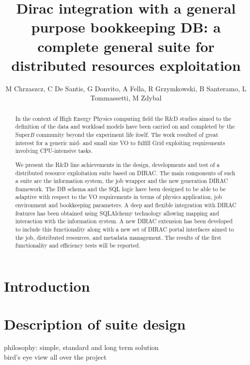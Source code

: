 \documentclass[a4paper]{jpconf}
\begin{document}
\title{Dirac integration with a general purpose bookkeeping DB: a complete general suite for distributed resources exploitation}

\author{M Chrzaszcz, C De Santis, G Donvito, A Fella, R Grzymkowski, B Santeramo, L Tommassetti, M Zdybal}

%
%
%
%
%

\begin{abstract}
In the context of High Energy Physics computing field the R\&D studies aimed to
the definition of the data and workload models have been carried on and 
completed by the Super$B$ community beyond the experiment life itself.
The work resulted of great interest for a generic mid- and small size VO to 
fulfill Grid exploiting requirements involving CPU-intensive tasks.

We present the R\&D line achievements in the design, developments and test of a
distributed resource exploitation suite based on DIRAC. The main components of
such a suite are the information system, the job wrapper and the new generation
DIRAC framework. The DB schema and the SQL logic have been designed to be able
to be adaptive with respect to the VO requirements in terms of physics 
application, job environment and bookkeeping parameters. A deep and flexible 
integration with DIRAC features has been obtained using SQLAlchemy technology
allowing mapping and interaction with the information system. A new DIRAC
extension has been developed to include this functionality along with a new set
of DIRAC portal interfaces aimed to the job, distributed resources, and
metadata management. The results of the first functionality and efficiency
tests will be reported.
\end{abstract}

\section{Introduction}

\section{Description of suite design}
philosophy: simple, standard and long term solution\\
bird's eye view all over the project\\
\end{document}
